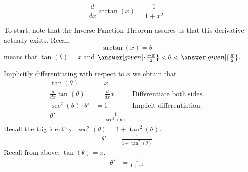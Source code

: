 \documentclass{ximera}
\begin{document}
\begin{theorem}
  \[
  \frac{d}{dx} \arctan(x) = \frac{1}{1+x^2}.
  \]
  \begin{explanation} 
     To start, note that the Inverse Function Theorem assures us that this
     derivative actually exists.
    Recall
    \[
    \arctan(x) = \theta
    \]
    means that $\tan(\theta) = x$ and $\answer[given]{\frac{-\pi}{2}}<
    \theta< \answer[given]{\frac{\pi}{2}}$. 
    
     Implicitly
    differentiating with respect to $x$ we obtain that
    \begin{align*}
      \tan(\theta) &= x\\
      \frac{d}{dx} \tan(\theta) &= \frac{d}{dx} x         &\text{Differentiate both sides.}\\
      \sec^2(\theta) \cdot \theta' &= 1   &\text{Implicit differentiation.}\\
      \theta' &= \frac{1}{\sec^2(\theta)} 
       \end{align*}
      Recall the trig identity:  $\sec^2(\theta)=1+\tan^2(\theta)$.\\
        \begin{align*}
          \theta' &= \frac{1}{1+\tan^2(\theta)} 
         \end{align*}
         Recall from above:  $\tan(\theta) = x$.\\
          \begin{align*}
          \theta' &= \frac{1}{1+x^2} 
         \end{align*}
        

\end{explanation}
\end{theorem}
\end{document}
